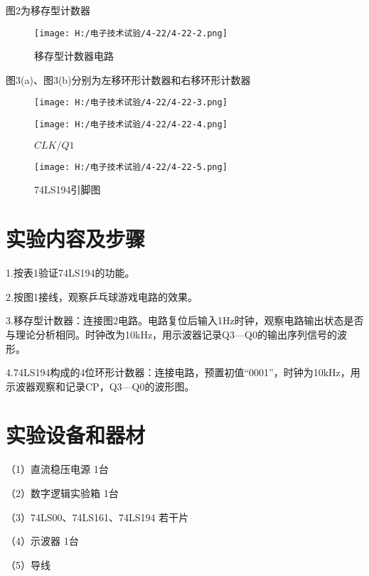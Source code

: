 \documentclass{article}
\begin{document}
       图2为移存型计数器
       \begin{figure}[h]
        \centering
        \texttt{[image: H:/电子技术试验/4-22/4-22-2.png]}
        \caption{移存型计数器电路} \label{fig:aa}
        \end{figure}
       图3(a)、图3(b)分别为左移环形计数器和右移环形计数器
       \begin{figure}[h]
        \begin{minipage}[t]{0.5\linewidth} %
          \centering   
          \texttt{[image: H:/电子技术试验/4-22/4-22-3.png]}   
          \caption{$CLK/Q0$}   
          \label{fig:side:a}   
        \end{minipage}%
        \begin{minipage}[t]{0.5\linewidth}   
          \centering   
          \texttt{[image: H:/电子技术试验/4-22/4-22-4.png]}   
          \caption{$CLK/Q1$}   
          \label{fig:side:b}   
        \end{minipage}   
      \end{figure}
      \begin{figure}[h]
        \centering
        \texttt{[image: H:/电子技术试验/4-22/4-22-5.png]}
        \caption{74LS194引脚图} \label{fig:aa}
        \end{figure}

\section{ 实验内容及步骤}
1.按表1验证74LS194的功能。\par
2.按图1接线，观察乒乓球游戏电路的效果。\par
3.移存型计数器：连接图2电路。电路复位后输入1Hz时钟，观察电路输出状态是否与理论分析相同。时钟改为10kHz，用示波器记录Q3—Q0的输出序列信号的波形。\par
4.74LS194构成的4位环形计数器：连接电路，预置初值“0001”，时钟为10kHz，用示波器观察和记录CP，Q3—Q0的波形图。\par



\section{ 实验设备和器材}
（1）直流稳压电源              \qquad \quad \qquad \qquad \qquad \qquad           1台\par
（2）数字逻辑实验箱            \qquad  \qquad \qquad \qquad\qquad                1台\par
（3）74LS00、74LS161、74LS194              \quad                                    若干片\par
（4）示波器                   \qquad  \qquad \qquad \qquad\qquad  \qquad  \qquad    1台\par
（5）导线   
\end{document}
